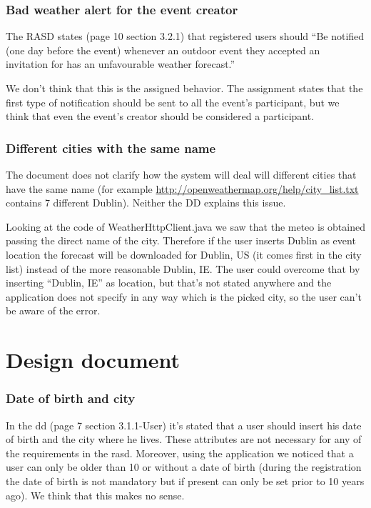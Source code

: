 \documentclass[10pt,a4paper,titlepage]{article}
\begin{document}
\section{Bad weather alert for the event creator}
The RASD states (page 10 section 3.2.1) that registered users should ``Be notified (one day before the event) whenever an outdoor event they accepted an invitation for has an unfavourable weather forecast.''

We don't think that this is the assigned behavior. The assignment states that the first type of notification should be sent to all the event's participant, but we think that even the event's creator should be considered a participant.

\section{Different cities with the same name}
The document does not clarify how the system will deal will different cities that have the same name (for example \url{http://openweathermap.org/help/city_list.txt} contains 7 different Dublin). Neither the DD explains this issue.

Looking at the code of WeatherHttpClient.java we saw that the meteo is obtained passing the direct name of the city. Therefore if the user inserts Dublin as event location the forecast will be downloaded for Dublin, US (it comes first in the city list) instead of the more reasonable Dublin, IE. The user could overcome that by inserting ``Dublin, IE'' as location, but that's not stated anywhere and the application does not specify in any way which is the picked city, so the user can't be aware of the error.

\pagebreak
\part{Design document}
\section{Date of birth and city}
In the dd (page 7 section 3.1.1-User) it's stated that a user should insert his date of birth and the city where he lives. These attributes are not necessary for any of the requirements in the rasd. Moreover, using the application we noticed that a user can only be older than 10 or without a date of birth (during the registration the date of birth is not mandatory but if present can only be set prior to 10 years ago). We think that this makes no sense.
\end{document}

